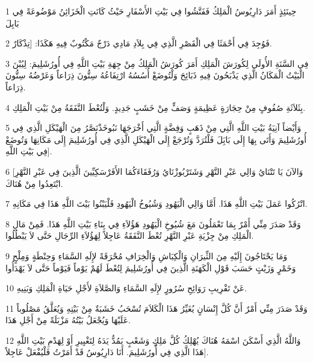 \par 1 حِينَئِذٍ أَمَرَ دَارِيُوسُ الْمَلِكُ فَفَتَّشُوا فِي بَيْتِ الأَسْفَارِ حَيْثُ كَانَتِ الْخَزَائِنُ مَوْضُوعَةً فِي بَابِلَ
\par 2 فَوُجِدَ فِي أَحْمَثَا فِي الْقَصْرِ الَّذِي فِي بِلاَدِ مَادِي دَرْجٌ مَكْتُوبٌ فِيهِ هَكَذَا: [تِذْكَارٌ.
\par 3 فِي السَّنَةِ الأُولَى لِكُورَشَ الْمَلِكِ أَمَرَ كُورَشُ الْمَلِكُ مِنْ جِهَةِ بَيْتِ اللَّهِ فِي أُورُشَلِيمَ: لِيُبْنَ الْبَيْتُ الْمَكَانُ الَّذِي يَذْبَحُونَ فِيهِ ذَبَائِحَ وَلْتُوضَعْ أُسُسُهُ ارْتِفَاعُهُ سِتُّونَ ذِرَاعاً وَعَرْضُهُ سِتُّونَ ذِرَاعاً.
\par 4 بِثَلاَثَةِ صُفُوفٍ مِنْ حِجَارَةٍ عَظِيمَةٍ وَصَفٍّ مِنْ خَشَبٍ جَدِيدٍ. وَلْتُعْطَ النَّفَقَةُ مِنْ بَيْتِ الْمَلِكِ.
\par 5 وَأَيْضاً آنِيَةُ بَيْتِ اللَّهِ الَّتِي مِنْ ذَهَبٍ وَفِضَّةٍ الَّتِي أَخْرَجَهَا نَبُوخَذْنَصَّرُ مِنَ الْهَيْكَلِ الَّذِي فِي أُورُشَلِيمَ وَأَتَى بِهَا إِلَى بَابَِلَ فَلْتُرَدَّ وَتُرْجَعْ إِلَى الْهَيْكَلِ الَّذِي فِي أُورُشَلِيمَ إِلَى مَكَانِهَا وَتُوضَعْ فِي بَيْتِ اللَّهِ].
\par 6 [وَالآنَ يَا تَتْنَايُ وَالِي عَبْرِ النَّهْرِ وَشَتَرْبُوزْنَايُ وَرُفَقَاءَكُمَا الأَفَرْسَكِيِّينَ الَّذِينَ فِي عَبْرِ النَّهْرِ ابْتَعِدُوا مِنْ هُنَاكَ.
\par 7 اتْرُكُوا عَمَلَ بَيْتِ اللَّهِ هَذَا. أَمَّا وَالِي الْيَهُودِ وَشُيُوخُ الْيَهُودِ فَلْيَبْنُوا بَيْتَ اللَّهِ هَذَا فِي مَكَانِهِ.
\par 8 وَقَدْ صَدَرَ مِنِّي أَمْرٌ بِمَا تَعْمَلُونَ مَعَ شُيُوخِ الْيَهُودِ هَؤُلاَءِ فِي بِنَاءِ بَيْتِ اللَّهِ هَذَا. فَمِنْ مَالِ الْمَلِكِ مِنْ جِزْيَةِ عَبْرِ النَّهْرِ تُعْطَ النَّفَقَةُ عَاجِلاً لِهَؤُلاَءِ الرِّجَالِ حَتَّى لاَ يَبْطُلُوا.
\par 9 وَمَا يَحْتَاجُونَ إِلَيْهِ مِنَ الثِّيرَانِ وَالْكِبَاشِ وَالْخِرَافِ مُحْرَقَةً لإِلَهِ السَّمَاءِ وَحِنْطَةٍ وَمِلْحٍ وَخَمْرٍ وَزَيْتٍ حَسَبَ قَوْلِ الْكَهَنَةِ الَّذِينَ فِي أُورُشَلِيمَ لِتُعْطَ لَهُمْ يَوْماً فَيَوْماً حَتَّى لاَ يَهْدَأُوا
\par 10 عَنْ تَقْرِيبِ رَوَائِحِ سُرُورٍ لإِلَهِ السَّمَاءِ وَالصَّلاَةِ لأَجْلِ حَيَاةِ الْمَلِكِ وَبَنِيهِ.
\par 11 وَقَدْ صَدَرَ مِنِّي أَمْرٌ أَنَّ كُلَّ إِنْسَانٍ يُغَيِّرُ هَذَا الْكَلاَمَ تُسْحَبُ خَشَبَةٌ مِنْ بَيْتِهِ وَيُعَلَّقُ مَصْلُوباً عَلَيْهَا وَيُجْعَلُ بَيْتُهُ مَزْبَلَةً مِنْ أَجْلِ هَذَا.
\par 12 وَاللَّهُ الَّذِي أَسْكَنَ اسْمَهُ هُنَاكَ يُهْلِكُ كُلَّ مَلِكٍ وَشَعْبٍ يَمُدُّ يَدَهُ لِتَغْيِيرِ أَوْ لِهَدْمِ بَيْتِ اللَّهِ هَذَا الَّذِي فِي أُورُشَلِيمَ. أَنَا دَارِيُوسُ قَدْ أَمَرْتُ فَلْيُفْعَلْ عَاجِلاً].
